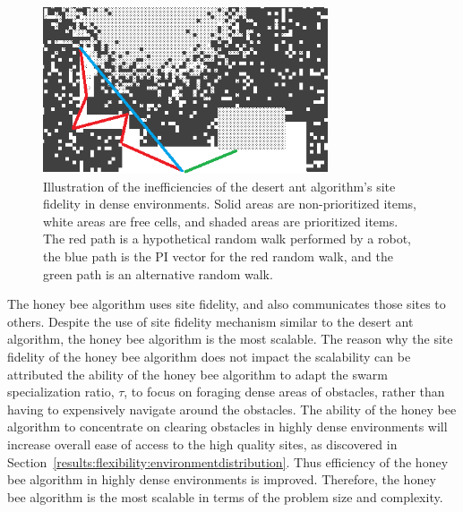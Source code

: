 \begin{figure}[!htb]
\centering
\includegraphics[width=0.75\textwidth]{chapters/chapter6/figures/problem-scalability-desertant.png}
\caption{Illustration of the inefficiencies of the desert ant algorithm's site fidelity in dense environments. Solid areas are non-prioritized items, white areas are free cells, and shaded areas are prioritized items. The red path is a hypothetical random walk performed by a robot, the blue path is the PI vector for the red random walk, and the green path is an alternative random walk.}
\label{fig:desertantsitefidelity}
\end{figure}

The honey bee algorithm uses site fidelity, and also communicates those sites to others. Despite the use of site fidelity mechanism similar to the desert ant algorithm, the honey bee algorithm is the most scalable. The reason why the site fidelity of the honey bee algorithm does not impact the scalability can be attributed the ability of the honey bee algorithm to adapt the swarm specialization ratio, $\tau$, to focus on foraging dense areas of obstacles, rather than having to expensively navigate around the obstacles. The ability of the honey bee algorithm to concentrate on clearing obstacles in highly dense environments will increase overall ease of access to the high quality sites, as discovered in Section~\ref{results:flexibility:environmentdistribution}. Thus efficiency of the honey bee algorithm in highly dense environments is improved. Therefore, the honey bee algorithm is the most scalable in terms of the problem size and complexity.

